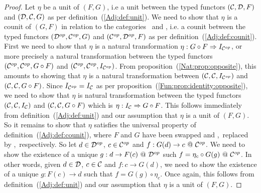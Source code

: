 \begin{proof}
    Let $\eta$ be a unit of $(F,G)$, i.e a unit between the typed functors 
    $(\mbox{$\cal C$},\mbox{$\cal D$},F)$ and $(\mbox{$\cal D$},\mbox{$\cal C$},G)$ as per definition~(\ref{Adj:def:unit}).
    We need to show that $\eta$ is a counit of $(G,F)$ in relation to the 
    categories \Dop\ and \Cop, i.e. a counit between the typed functors
    $(\mbox{${\cal D}^{op}$},\mbox{${\cal C}^{op}$},G)$ and $(\mbox{${\cal C}^{op}$},\mbox{${\cal D}^{op}$},F)$ as per definition~(\ref{Adj:def:counit}).
    First we need to show that $\eta$ is a natural transformation
    $\eta:G\circ F\Rightarrow I_{{\cal C}^{op}}$, or more precisely a natural
    transformation between the typed functors $(\mbox{${\cal C}^{op}$},\mbox{${\cal C}^{op}$},G\circ F)$ and
    $(\mbox{${\cal C}^{op}$},\mbox{${\cal C}^{op}$},I_{{\cal C}^{op}})$. From proposition~(\ref{Nat:prop:opposite}),
    this amounts to showing that $\eta$ is a natural transformation between
    $(\mbox{$\cal C$},\mbox{$\cal C$},I_{{\cal C}^{op}})$ and $(\mbox{$\cal C$},\mbox{$\cal C$},G\circ F)$. Since 
    $I_{{\cal C}^{op}}=I_{\cal C}$ as per 
    proposition~(\ref{Fun:prop:identity:opposite}), we need to show that
    $\eta$ is natural transformation between the typed functors 
    $(\mbox{$\cal C$},\mbox{$\cal C$},I_{\cal C})$ and $(\mbox{$\cal C$},\mbox{$\cal C$},G\circ F)$ which is
    $\eta:I_{\cal C}\Rightarrow G\circ F$. This follows immediately from 
    definition~(\ref{Adj:def:unit}) and our assumption that $\eta$ is 
    a unit of $(F,G)$. So it remains to show that $\eta$ satisfies the 
    universal property of definition~(\ref{Adj:def:counit}), where
    $F$ and $G$ have been swapped and \Cat,\Dat\ replaced by \Dop,\Cop\
    respectively. So let $d\in\mbox{${\cal D}^{op}$}$, $c\in\mbox{${\cal C}^{op}$}$ and $f:G(d)\to c\ @\ \mbox{${\cal C}^{op}$}$.
    We need to show the existence of a unique $g:d\to F(c)\ @\ \Dop$ such
    $f=\eta_{c}\circ G(g)\ @\ \Cop$. In other words, given $d\in\mbox{$\cal D$}$, $c\in\mbox{$\cal C$}$
    and $f:c\to G(d)$, we need to show the existence of a unique
    $g:F(c)\to d$ such that $f=G(g)\circ\eta_{c}$. Once again, this 
    follows from definition~(\ref{Adj:def:unit}) and our assumption that 
    $\eta$ is a unit of $(F,G)$. 
\end{proof}
